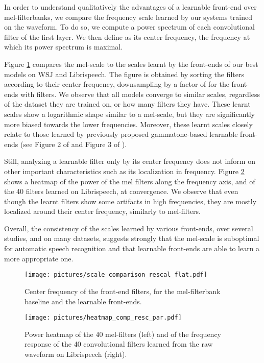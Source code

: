 \documentclass[a4paper]{article}
\begin{document}
In order to understand qualitatively the advantages of a learnable front-end over mel-filterbanks, we compare the frequency scale learned by our systems trained on the waveform. To do so, we compute a power spectrum of each convolutional filter of the first layer. We then define as its center frequency, the frequency at which its power spectrum is maximal. 

Figure \ref{fig:scale_comp} compares the mel-scale to the scales learnt by the 
front-ends of our best models on WSJ and Librispeech.
The figure is obtained by sorting the filters according to their center frequency, downsampling by a factor of  for the front-ends with  filters.
We observe that all 
models converge to 
similar scales, regardless of the dataset they are trained on, or how many filters they have. These learnt scales show a logarithmic shape similar to a mel-scale, but 
they are significantly more biased towards the lower frequencies. Moreover, these learnt scales closely relate to those learned by previously proposed gammatone-based learnable front-ends (see Figure 2 of \cite{hoshen2015speech} and Figure 3 of \cite{sainath2015learning}).

Still, analyzing a learnable filter only by its center frequency does not inform on other important characteristics such as its localization in frequency. Figure \ref{fig:heat_comp} shows a heatmap of the power of the mel filters along the frequency axis, and of the 40 filters learned on Librispeech, at convergence. We observe that even though the learnt filters show some artifacts in high frequencies, they are mostly localized around their center frequency, similarly to mel-filters. 

Overall, the consistency of the scales learned by various front-ends, over several studies, and on many datasets, suggests strongly that the mel-scale is suboptimal for automatic speech recognition and that learnable front-ends are able to learn a more appropriate one.

\begin{figure}[t]
  \texttt{[image: pictures/scale\_comparison\_rescal\_flat.pdf]}
  \caption{Center frequency of the front-end filters, for the mel-filterbank baseline and the learnable front-ends.}
  \label{fig:scale_comp}
\end{figure}

\begin{figure}[t]
  \texttt{[image: pictures/heatmap\_comp\_resc\_par.pdf]}
  \caption{Power heatmap of the 40 mel-filters (left) and of the frequency response of the 40 convolutional filters learned from the raw waveform on Librispeech (right).}
  \label{fig:heat_comp}
\end{figure}
\end{document}
